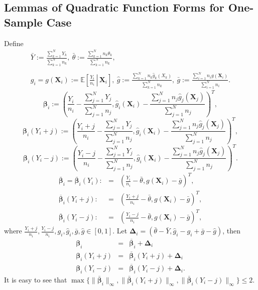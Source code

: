 \documentclass[12pt,letterpaper]{article}
\begin{document}
\subsection{Lemmas of Quadratic Function Forms for One-Sample Case}
Define 
\begin{equation}\label{eq:notations:one-sample}
\begin{array}{rcl}
&\displaystyle\bar{Y}:=\frac{\sum_{k=1}^NY_k}{\sum_{k=1}^Nn_k},\ \bar{\theta}:=\frac{\sum_{k=1}^Nn_k\theta_k}{\sum_{k=1}^Nn_k},&\\
\\
&\displaystyle g_i=g(\mathbf{X}_i):=\mathbb{E} \left[ \left. \frac{Y_i}{n_i} \, \right|\, \mathbf{X}_i \right],\ \hat{g}:=\frac{\sum_{k=1}^Nn_k\hat{g}_k(X_k)}{\sum_{k=1}^Nn_k},\ \bar{g}:=\frac{\sum_{i=1}^Nn_ig(\mathbf{X}_i)}{\sum_{i=1}^Nn_i}.&
\end{array}
\end{equation}
$$\boldsymbol{\beta}_i:=\left(\frac{Y_i}{n_i}-\frac{\sum_{j=1}^NY_j}{\sum_{j=1}^Nn_j},\hat{g}_i(\mathbf{X}_i)-\frac{\sum_{j=1}^Nn_j\hat{g}_j(\mathbf{X}_{j})}{\sum_{j=1}^Nn_j}\right)^T,$$
$$\boldsymbol{\beta}_i(Y_i+j):=\left(\frac{Y_i+j}{n_i}-\frac{\sum_{j=1}^NY_j}{\sum_{j=1}^Nn_j},\hat{g}_i(\mathbf{X}_i)-\frac{\sum_{j=1}^Nn_j\hat{g}_j(\mathbf{X}_{j})}{\sum_{j=1}^Nn_j}\right)^T,$$
$$\boldsymbol{\beta}_i(Y_i-j):=\left(\frac{Y_i-j}{n_i}-\frac{\sum_{j=1}^NY_j}{\sum_{j=1}^Nn_j},\hat{g}_i(\mathbf{X}_i)-\frac{\sum_{j=1}^Nn_j\hat{g}_j(\mathbf{X}_{j})}{\sum_{j=1}^Nn_j}\right)^T.$$
$$\begin{array}{rcl}
\overline{\boldsymbol{\beta}}_i=\overline{\boldsymbol{\beta}}_i(Y_i):&=&\displaystyle\left(\frac{Y_i}{n_i}-\bar{\theta},g(\mathbf{X}_i)-\bar{g}\right)^T,\\
\overline{\boldsymbol{\beta}}_i(Y_i+j):&=&\displaystyle\left(\frac{Y_i+j}{n_i}-\bar{\theta},g(\mathbf{X}_i)-\bar{g}\right)^T,\\
\overline{\boldsymbol{\beta}}_i(Y_i-j):&=&\displaystyle\left(\frac{Y_i-j}{n_i}-\bar{\theta},g(\mathbf{X}_i)-\bar{g}\right)^T,
\end{array}$$
where $\displaystyle\frac{Y_i+j}{n_i},\frac{Y_i-j}{n_i}, g_i, \hat{g}_i, \bar{g}, \hat{g}\in[0,1]$. Let $\mathbf{\Delta}_i=(\bar{\theta}-\bar{Y},\hat{g}_i-g_i+\bar{g}-\hat{g})$, then 
\begin{equation}\label{def:beta}
\begin{array}{rcl}
\boldsymbol\beta_i&=&\overline{\boldsymbol{\beta}}_i+\mathbf{\Delta}_i\\
\boldsymbol\beta_i(Y_i+j)&=&\overline{\boldsymbol{\beta}}_i(Y_i+j)+\mathbf{\Delta}_i\\
\boldsymbol\beta_i(Y_i-j)&=&\overline{\boldsymbol{\beta}}_i(Y_i-j)+\mathbf{\Delta}_i.
\end{array}
\end{equation}
It is easy to see that $\max\{\|\boldsymbol{\bar\beta}_i\|_{\infty},\|\boldsymbol{\bar\beta}_i(Y_i+j)\|_{\infty},\|\boldsymbol{\bar\beta}_i(Y_i-j)\|_{\infty}\}\leq2$. 
\end{document}

